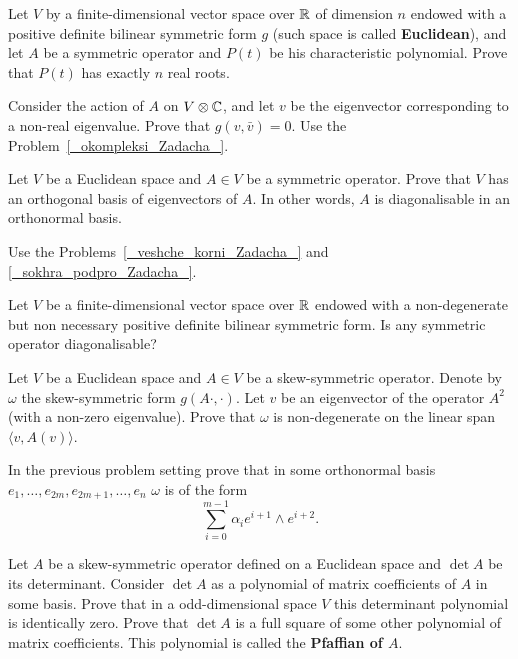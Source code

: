 \documentclass[12pt]{article}
\begin{document}
\begin{zadacha}[!]\label{_veshche_korni_Zadacha_}
Let  $V$ by a finite-dimensional vector space over ${\mathbb R}$ of dimension
$n$ endowed with a positive definite bilinear symmetric form $g$ (such
space is called {\bf Euclidean}), and let 
$A$  be a symmetric operator and  $P(t)$ be his characteristic
polynomial. Prove that $P(t)$ has exactly $n$ real roots.
\end{zadacha}

\begin{ukazanie}
  Consider the action of $A$ on $V\otimes {\mathbb C}$, and let $v$ be the
  eigenvector corresponding to a non-real eigenvalue. Prove that $g(v,
  \bar v)=0$. Use the Problem~\ref{_okompleksi_Zadacha_}.
\end{ukazanie}

\begin{zadacha}[!]
Let $V$ be a Euclidean space and $A\in V$ be a symmetric operator.
Prove that $V$ has an orthogonal basis of eigenvectors of $A$. In
other words, $A$ is diagonalisable in an orthonormal basis.
\end{zadacha}

\begin{ukazanie}
Use the Problems~\ref{_veshche_korni_Zadacha_}
and \ref{_sokhra_podpro_Zadacha_}.
\end{ukazanie}

\begin{zadacha}[*]
Let $V$ be a finite-dimensional vector space over ${\mathbb R}$ endowed with a
non-degenerate but non necessary positive definite bilinear symmetric
form. Is any symmetric operator diagonalisable?
\end{zadacha}

\begin{zadacha}[*]
Let $V$ be a Euclidean space and
$A\in V$ be a skew-symmetric operator. Denote by $\omega$ the
skew-symmetric form $g(A\cdot, \cdot)$. Let
$v$ be an eigenvector of the operator $A^2$
(with a non-zero eigenvalue).  Prove that  $\omega$ is non-degenerate
on the linear span  
$\langle v, A(v)\rangle$.
\end{zadacha}

\begin{zadacha}[*]
In the previous problem setting prove that in some orthonormal basis
$e_1, \dots, e_{2m}, e_{2m+1}, \dots, e_n$
$\omega$ is of the form
\[ \sum_{i=0}^{m-1} \alpha_i e^{i+1}\wedge e^{i+2}.\]
\end{zadacha}

\begin{zadacha}[*]
  Let $A$ be a skew-symmetric operator defined on a Euclidean space
  and $\det A$ be its determinant. Consider $\det A$ as a polynomial
  of matrix coefficients of $A$ in some basis. Prove that in a
  odd-dimensional space $V$ this determinant polynomial is identically
  zero. Prove that $\det A$ is a full square of some other polynomial
  of matrix coefficients. This polynomial is called the {\bf Pfaffian
    of $A$}.
\end{zadacha}
\end{document}
